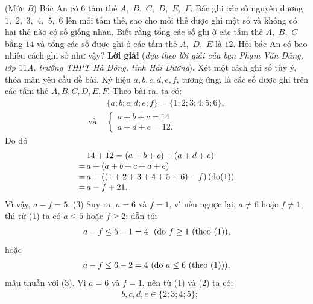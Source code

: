 \begin{multicols}{2}
	\setlength{\abovedisplayskip}{5pt}
	\setlength{\belowdisplayskip}{5pt}
	{}
	(Mức $B$) Bác An có $6$ tấm thẻ $A,$ $B,$ $C,$ $D,$ $E,$ $F$. Bác ghi các số nguyên dương $1,$ $2,$ $3,$ $4,$ $5,$ $6$ lên mỗi tấm thẻ, sao cho mỗi thẻ được ghi một số và không có hai thẻ nào có số giống nhau. Biết rằng tổng các số ghi ở các tấm thẻ $A,$ $B,$ $C$ bằng $14$ và tổng các số được ghi ở các tấm thẻ $A,$ $D,$ $E$ là $12$. Hỏi bác An có bao nhiêu cách ghi số như vậy?
	\vskip 0.05cm
	\textbf{\color{thachthuctoanhoc}Lời giải} (\textit{dựa theo lời giải của bạn Phạm Văn Đăng, lớp $11$A, trường THPT Hà Đông, tỉnh Hải Dương})\textbf{\color{thachthuctoanhoc}.}
	\vskip 0.05cm
	Xét một cách ghi số tùy ý, thỏa mãn yêu cầu đề bài.
	\vskip 0.05cm
	Ký hiệu $a, b, c, d, e, f$, tương ứng, là các số được ghi trên các tấm thẻ $A, B, C, D, E, F$.
	\vskip 0.05cm
	Theo bài ra, ta có:
	\begin{align*}
		&\{a; b; c; d; e; f\} = \{1; 2; 3; 4; 5; 6\}, \tag{$1$}\\
	\text{và }
		&\begin{cases}
			a + b + c = 14\\[-0.6ex]
			a + d + e = 12. 
		\end{cases} \tag{$2$}
	\end{align*}
	Do đó
	\begin{align*}
			&14 + 12 = \left( {a + b + c} \right) + \left( {a + d + e} \right) \\[-0.6ex]
			=\, &a + \left( {a + b + c + d + e} \right)\\[-0.6ex]
			 = \,&a + \left( {\left( {1 + 2 + 3 + 4 + 5 + 6} \right) - f} \right)\left( {{\rm{do}}(1)} \right)\\[-0.6ex]
			 = \,&a - f + 21.
	\end{align*}
	Vì vậy, $a -  f = 5$. \hfill ($3$)
	\vskip 0.05cm
	Suy ra, $a = 6$ và $f = 1$, vì nếu ngược lại, $a \ne 6$ hoặc $f \ne 1$, thì từ ($1$) ta có $a \le 5$ hoặc $f \ge 2$; dẫn tới
	\begin{align*}
		a - f \le 5 - 1 = 4 \text{ \,\,(do  $f \ge 1$ (theo ($1$))},
	\end{align*}
	hoặc 
	\begin{align*}
		a - f \le 6 - 2 = 4 \text{\,\,(do  $a \le 6$ (theo ($1$)))},
	\end{align*}
	mâu thuẫn với ($3$).
	\vskip 0.05cm
	Vì $a = 6$ và $f = 1$, nên từ ($1$) và ($2$) ta có:
	\begin{align*}
		&b, c, d, e \in \{2; 3; 4; 5\}; \tag{$4$}\\[-0.6ex]

\end{align*}
\end{multicols}
